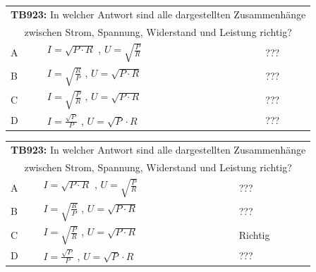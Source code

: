 \begin{frame}
	\begin{small}	
	\begin{tabular}{|l|l|l|}
	\hline
		\multicolumn{3}{|c|}{\textbf{TB923:} In welcher Antwort sind alle dargestellten Zusammenhänge }\\
		\multicolumn{3}{|c|}{zwischen Strom, Spannung, Widerstand und Leistung richtig? }\\
		\hline
		A & $I = \sqrt{P \cdot R}$ , $U = \sqrt{\frac{P}{R}}$ & ??? \\ \hline
		B & $I = \sqrt{\frac{R}{P}}$ , $U = \sqrt{P \cdot R}$& ??? \\ \hline
		C &  $I = \sqrt{\frac{P}{R}}$ , $U = \sqrt{P \cdot R}$ & ??? \\ \hline
		D &  $I = \frac{\sqrt{P}}{P}$ , $U = \sqrt{P} \cdot R$ &??? \\ \hline 		
	\end{tabular}
	\end{small}
\end{frame}
\begin{frame}
	\begin{small}	
	\begin{tabular}{|l|l|l|}
	\hline
		\multicolumn{3}{|c|}{\textbf{TB923:} In welcher Antwort sind alle dargestellten Zusammenhänge }\\
		\multicolumn{3}{|c|}{zwischen Strom, Spannung, Widerstand und Leistung richtig? }\\
		\hline
		A & $I = \sqrt{P \cdot R}$ , $U = \sqrt{\frac{P}{R}}$ & ??? \\ \hline
		B & $I = \sqrt{\frac{R}{P}}$ , $U = \sqrt{P \cdot R}$& ??? \\ \hline
		C &  $I = \sqrt{\frac{P}{R}}$ , $U = \sqrt{P \cdot R}$ & Richtig \\ \hline
		D &  $I = \frac{\sqrt{P}}{P}$ , $U = \sqrt{P} \cdot R$ &??? \\ \hline 		
	\end{tabular}
	\end{small}
\end{frame}

